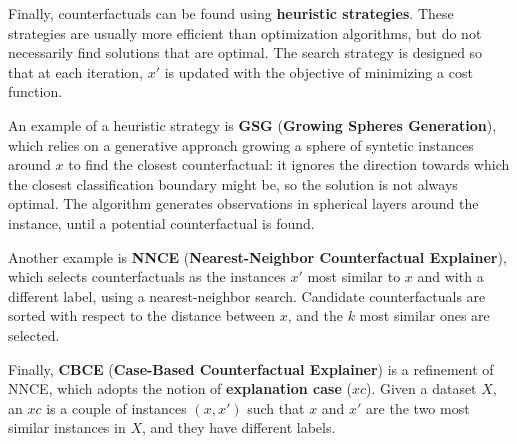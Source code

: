Finally, counterfactuals can be found using \textbf{heuristic strategies}. These strategies are usually more efficient than optimization algorithms, but do not necessarily find solutions that are optimal. The search strategy is designed so that at each iteration, $x'$ is updated with the objective of minimizing a cost function.

An example of a heuristic strategy is \textbf{GSG} (\textbf{Growing Spheres Generation}), which relies on a generative approach growing a sphere of syntetic instances around $x$ to find the closest counterfactual: it ignores the direction towards which the closest classification boundary might be, so the solution is not always optimal. The algorithm generates observations in spherical layers around the instance, until a potential counterfactual is found.

Another example is \textbf{NNCE} (\textbf{Nearest-Neighbor Counterfactual Explainer}), which selects counterfactuals as the instances $x'$ most similar to $x$ and with a different label, using a nearest-neighbor search. Candidate counterfactuals are sorted with respect to the distance between $x$, and the $k$ most similar ones are selected.

Finally, \textbf{CBCE} (\textbf{Case-Based Counterfactual Explainer}) is a refinement of NNCE, which adopts the notion of \textbf{explanation case} ($xc$). Given a dataset $X$, an $xc$ is a couple of instances $(x,x')$ such that $x$ and $x'$ are the two most similar instances in $X$, and they have different labels.